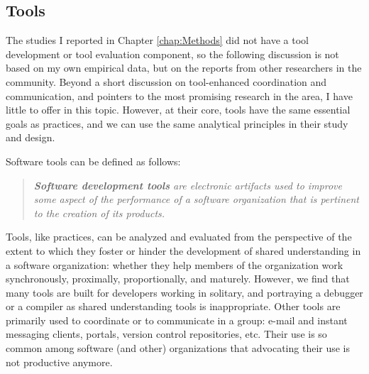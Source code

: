 \subsection{Tools}

The studies I reported in Chapter \ref{chap:Methods} did not have a tool development or tool evaluation component, so the following discussion is not based on my own empirical data, but on the reports from other researchers in the community. Beyond a short discussion on tool-enhanced coordination and communication, and pointers to the most promising research in the area, I have little to offer in this topic. However, at their core, tools have the same essential goals as practices, and we can use the same analytical principles in their study and design.

Software tools can be defined as follows:

\begin{quote}
\emph{\textbf{Software development tools} are electronic artifacts used to improve some aspect of the performance of a software organization that is pertinent to the creation of its products.}
\end{quote}

Tools, like practices, can be analyzed and evaluated from the perspective of the extent to which they foster or hinder the development of shared understanding in a software organization: whether they help members of the organization work synchronously, proximally, proportionally, and maturely. However, we find that many tools are built for developers working in solitary, and portraying a debugger or a compiler as shared understanding tools is inappropriate. Other tools are primarily used to coordinate or to communicate in a group: e-mail and instant messaging clients, portals, version control repositories, etc. Their use is so common among software (and other) organizations that advocating their use is not productive anymore.

